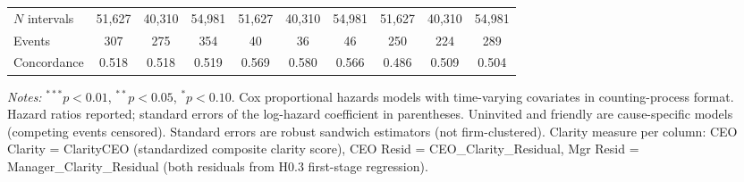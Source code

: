 \documentclass[12pt,a4paper]{article}
\begin{document}
\begin{table}[H]
\begin{threeparttable}
\begin{scriptsize}
\begin{tabular}{lccccccccc}
\midrule
$N$ intervals & 51,627 & 40,310 & 54,981 & 51,627 & 40,310 & 54,981 & 51,627 & 40,310 & 54,981 \\
Events & 307 & 275 & 354 & 40 & 36 & 46 & 250 & 224 & 289 \\
Concordance & 0.518 & 0.518 & 0.519 & 0.569 & 0.580 & 0.566 & 0.486 & 0.509 & 0.504 \\
\bottomrule
\end{tabular}
\end{scriptsize}
\begin{tablenotes}[flushleft]
\footnotesize
\item \textit{Notes:} $^{***}p<0.01$, $^{**}p<0.05$, $^{*}p<0.10$. Cox proportional hazards models with time-varying covariates in counting-process format. Hazard ratios reported; standard errors of the log-hazard coefficient in parentheses. Uninvited and friendly are cause-specific models (competing events censored). Standard errors are robust sandwich estimators (not firm-clustered). Clarity measure per column: CEO Clarity = ClarityCEO (standardized composite clarity score), CEO Resid = CEO\_Clarity\_Residual, Mgr Resid = Manager\_Clarity\_Residual (both residuals from H0.3 first-stage regression).
\end{tablenotes}
\end{threeparttable}
\end{table}
\end{document}

